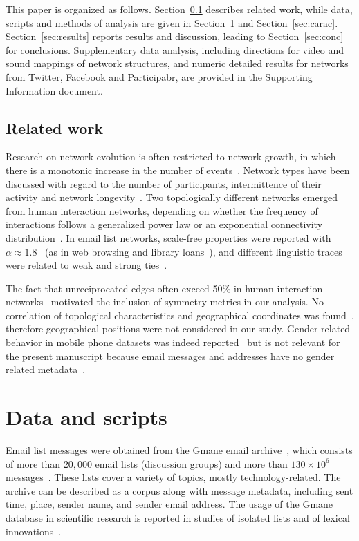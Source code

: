\documentclass[%
aip,
jmp,%
amsmath,amssymb,
reprint,%
]{revtex4-1}
\begin{document}
This paper is organized as follows. Section~\ref{sec:related} describes related work, while data, scripts and methods of analysis are given in Section~\ref{sec:data} and Section~\ref{sec:carac}.
Section~\ref{sec:results} reports results and discussion, leading to Section~\ref{sec:conc} for conclusions.
Supplementary data analysis, including directions for video and sound mappings of network structures, and numeric detailed results for networks from Twitter, Facebook and Participabr, are provided in the Supporting Information document.


\subsection{Related work}\label{sec:related}
Research on network evolution is often restricted to network growth, in which there is a monotonic increase in the number of events~\cite{barabasiEvo}.
Network types have been discussed with regard to the number of participants, intermittence of their activity and network longevity~\cite{barabasiEvo}. Two topologically different networks emerged from human interaction networks, depending on whether the frequency of interactions follows a generalized power law or an exponential connectivity distribution~\cite{barabasiTopologicalEv}. In email list networks, scale-free properties were reported with $\alpha \approx 1.8$~\cite{bird} (as in web browsing and library loans~\cite{barabasiHumanDyn}), and different linguistic traces were related to weak and strong ties~\cite{Gmane2}.

The fact that unreciprocated edges often exceed 50\% in human interaction networks~\cite{newmanEvolving} motivated the inclusion of symmetry metrics in our analysis.
No correlation of topological characteristics and geographical coordinates was found~\cite{barabasiGeo},
therefore geographical positions were not considered in our study.
Gender related behavior in mobile phone datasets was indeed reported~\cite{barabasiSex}
but is not relevant for the present manuscript because email messages and addresses have no gender related metadata~\cite{gmanePack}.


\section{Data and scripts}\label{sec:data}\label{scripts}

Email list messages were obtained from
the Gmane email archive~\cite{gmanePack}, which consists of more than $20,000$
email lists (discussion groups) and more than $130\times 10^6$ messages~\cite{Gmanewikipedia}. These lists cover a variety of topics, mostly technology-related. The archive can be described as a corpus along with message metadata, including sent time, place, sender name, and sender email address.
The usage of the Gmane database in scientific research is reported in studies of isolated lists and of lexical innovations~\cite{Gmane2,bird}. 
\end{document}
